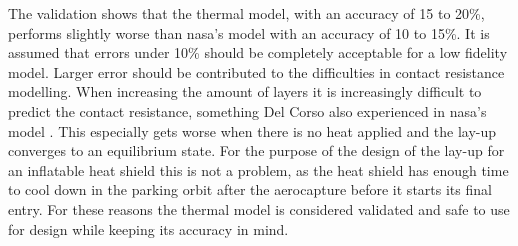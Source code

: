 The validation shows that the thermal model, with an accuracy of 15 to 20\%, performs slightly worse than \gls{nasa}'s model with an accuracy of 10 to 15\%. It is assumed that errors under 10\% should be completely acceptable for a low fidelity model. Larger error should be contributed to the difficulties in contact resistance modelling. When increasing the amount of layers it is increasingly difficult to predict the contact resistance, something Del Corso also experienced in \gls{nasa}'s model \cite{Corso2009}. This especially gets worse when there is no heat applied and the lay-up converges to an equilibrium state. For the purpose of the design of the lay-up for an inflatable heat shield this is not a problem, as the heat shield has enough time to cool down in the parking orbit after the aerocapture before it starts its final entry. For these reasons the thermal model is considered validated and safe to use for design while keeping its accuracy in mind.